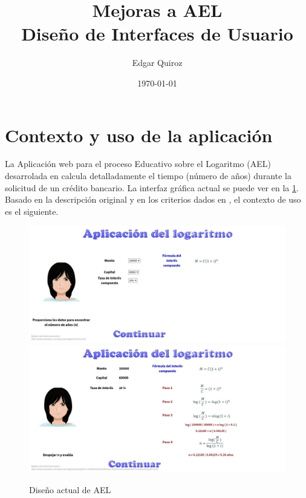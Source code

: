 \documentclass[titlepage]{article}
\author{Edgar Quiroz}
\date{\today}
\title{
  Mejoras a AEL\\
  Diseño de Interfaces de Usuario
}
\begin{document}
\begin{titlepage}
\maketitle
\end{titlepage}

\section{Contexto y uso de la aplicación}
La Aplicación web para el proceso Educativo sobre el Logaritmo  (AEL)
desarrolada en \cite{Salas-Rueda_2020} calcula detalladamente el tiempo (número
de años) durante la solicitud de un crédito bancario. La interfaz gráfica actual
se puede ver en la \cref{img:ael}. Basado en la descripción original y en los
criterios dados en \cite{req}, el contexto de uso es el siguiente.

\begin{figure}
\centering
\includegraphics[scale=0.25]{./imgs/ael_inicio.jpg}
\includegraphics[scale=0.25]{./imgs/ael_fin.jpg}
\caption{Diseño actual de AEL}
\label{img:ael}
\end{figure}
\end{document}
